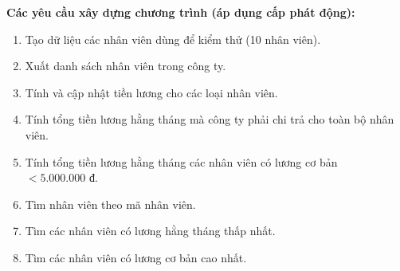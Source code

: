 \documentclass[12pt,a4paper]{article}
\begin{document}
\noindent\textbf{Các yêu cầu xây dựng chương trình (áp dụng cấp phát động):}
\begin{enumerate}[itemsep=0.15em]
    \item Tạo dữ liệu các nhân viên dùng để kiểm thử (10 nhân viên).
    \item Xuất danh sách nhân viên trong công ty.
    \item Tính và cập nhật tiền lương cho các loại nhân viên.
    \item Tính tổng tiền lương hằng tháng mà công ty phải chi trả cho toàn bộ nhân viên.
    \item Tính tổng tiền lương hằng tháng các nhân viên có lương cơ bản $< 5.000.000\text{ đ}$.
    \item Tìm nhân viên theo mã nhân viên.
    \item Tìm các nhân viên có lương hằng tháng thấp nhất.
    \item Tìm các nhân viên có lương cơ bản cao nhất.
\end{enumerate}
\end{document}
